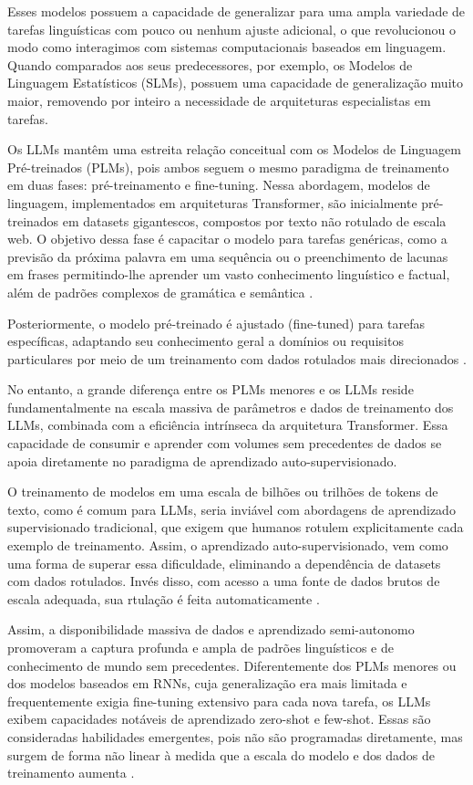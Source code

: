 Esses modelos possuem a capacidade de generalizar para uma ampla variedade de tarefas linguísticas com pouco ou nenhum ajuste adicional, o que revolucionou o modo como interagimos com sistemas computacionais baseados em linguagem. Quando comparados aos seus predecessores, por exemplo, os Modelos de Linguagem Estatísticos (SLMs), possuem uma capacidade de generalização muito maior, removendo por inteiro a necessidade de arquiteturas especialistas em tarefas. 

Os LLMs mantêm uma estreita relação conceitual com os Modelos de Linguagem Pré-treinados (PLMs), pois ambos seguem o mesmo paradigma de treinamento em duas fases: pré-treinamento e fine-tuning. Nessa abordagem, modelos de linguagem, implementados em arquiteturas Transformer, são inicialmente pré-treinados em datasets gigantescos, compostos por texto não rotulado de escala web. O objetivo dessa fase é capacitar o modelo para tarefas genéricas, como a previsão da próxima palavra em uma sequência ou o preenchimento de lacunas em frases permitindo-lhe aprender um vasto conhecimento linguístico e factual, além de padrões complexos de gramática e semântica \cite{devlin_bert:_2018}.

Posteriormente, o modelo pré-treinado é ajustado (fine-tuned) para tarefas específicas, adaptando seu conhecimento geral a domínios ou requisitos particulares por meio de um treinamento com dados rotulados mais direcionados \cite{xu_contrastive_2024}.

No entanto, a grande diferença entre os PLMs menores e os LLMs reside fundamentalmente na escala massiva de parâmetros e dados de treinamento dos LLMs, combinada com a eficiência intrínseca da arquitetura Transformer. Essa capacidade de consumir e aprender com volumes sem precedentes de dados se apoia diretamente no paradigma de aprendizado auto-supervisionado.

O treinamento de modelos em uma escala de bilhões ou trilhões de tokens de texto, como é comum para LLMs, seria inviável com abordagens de aprendizado supervisionado tradicional, que exigem que humanos rotulem explicitamente cada exemplo de treinamento. Assim, o aprendizado auto-supervisionado, vem como uma forma de superar essa dificuldade, eliminando a dependência de datasets com dados rotulados. Invés disso, com acesso a uma fonte de dados brutos de escala adequada, sua rtulação é feita automaticamente \cite{balestriero_cookbook_2023}.

Assim, a disponibilidade massiva de dados e aprendizado semi-autonomo promoveram a captura profunda e ampla de padrões linguísticos e de conhecimento de mundo sem precedentes. Diferentemente dos PLMs menores ou dos modelos baseados em RNNs, cuja generalização era mais limitada e frequentemente exigia fine-tuning extensivo para cada nova tarefa, os LLMs exibem capacidades notáveis de aprendizado zero-shot e few-shot. Essas são consideradas habilidades emergentes, pois não são programadas diretamente, mas surgem de forma não linear à medida que a escala do modelo e dos dados de treinamento aumenta \cite{wei_emergent_2022}.


